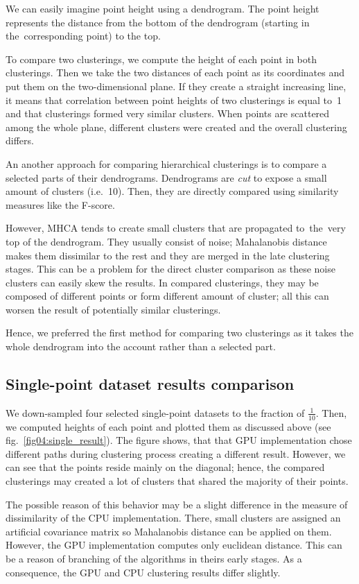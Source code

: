 We can easily imagine point height using a dendrogram. The point height represents the distance from the bottom of the dendrogram (starting in the~corresponding point) to the top.

To compare two clusterings, we compute the height of each point in both clusterings. Then we take the two distances of each point as its coordinates and put them on the two-dimensional plane. If they create a straight increasing line, it means that correlation between point heights of two clusterings is equal to~1 and that clusterings formed very similar clusters. When points are scattered among the whole plane, different clusters were created and the overall clustering differs.

An another approach for comparing hierarchical clusterings is to compare a selected parts of their dendrograms. Dendrograms are \emph{cut} to expose a small amount of clusters (i.e.~10). Then, they are directly compared using similarity measures like the F-score.

However, MHCA tends to create small clusters that are propagated to~the~very top of the dendrogram. They usually consist of noise; Mahalanobis distance makes them dissimilar to the rest and they are merged in the late clustering stages. This can be a problem for the direct cluster comparison as these noise clusters can easily skew the results. In compared clusterings, they may be composed of different points or form different amount of cluster; all this can worsen the result of potentially similar clusterings. 

Hence, we preferred the first method for comparing two clusterings as it takes the whole dendrogram into the account rather than a selected part.

\subsection{Single-point dataset results comparison}

We down-sampled four selected single-point datasets to the fraction of $\frac{1}{10}$. Then, we computed heights of each point and plotted them as discussed above (see fig.~\ref{fig04:single_result}). The figure shows, that that GPU implementation chose different paths during clustering process creating a different result. However, we can see that the points reside mainly on the diagonal; hence, the compared clusterings may created a lot of clusters that shared the majority of their points.

The possible reason of this behavior may be a slight difference in the measure of dissimilarity of the CPU implementation. There, small clusters are assigned an artificial covariance matrix so Mahalanobis distance can be applied on them. However, the GPU implementation computes only euclidean distance. This can be a reason of branching of the algorithms in theirs early stages. As a consequence, the GPU and CPU clustering results differ slightly.

